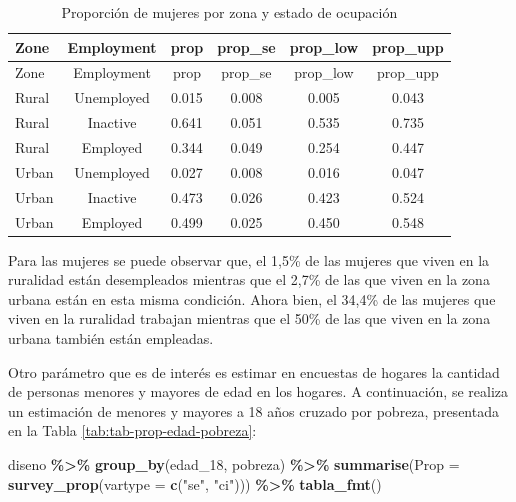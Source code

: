 \documentclass[
  spanish,
  12pt,
]{book}
\newenvironment{Shaded}{\begin{snugshade}}{\end{snugshade}}
\newcommand{\AttributeTok}[1]{\textcolor[rgb]{0.13,0.29,0.53}{#1}}
\newcommand{\FunctionTok}[1]{\textcolor[rgb]{0.13,0.29,0.53}{\textbf{#1}}}
\newcommand{\NormalTok}[1]{#1}
\newcommand{\SpecialCharTok}[1]{\textcolor[rgb]{0.81,0.36,0.00}{\textbf{#1}}}
\newcommand{\StringTok}[1]{\textcolor[rgb]{0.31,0.60,0.02}{#1}}
\begin{document}
\begin{longtable}[]{@{}lccccc@{}}
\caption{\label{tab:tab-prop-zona-empleo-mujer}Proporción de mujeres por zona y estado de ocupación}\tabularnewline
\toprule\noalign{}
Zone & Employment & prop & prop\_se & prop\_low & prop\_upp \\
\midrule\noalign{}
\endfirsthead
\toprule\noalign{}
Zone & Employment & prop & prop\_se & prop\_low & prop\_upp \\
\midrule\noalign{}
\endhead
\bottomrule\noalign{}
\endlastfoot
Rural & Unemployed & 0.015 & 0.008 & 0.005 & 0.043 \\
Rural & Inactive & 0.641 & 0.051 & 0.535 & 0.735 \\
Rural & Employed & 0.344 & 0.049 & 0.254 & 0.447 \\
Urban & Unemployed & 0.027 & 0.008 & 0.016 & 0.047 \\
Urban & Inactive & 0.473 & 0.026 & 0.423 & 0.524 \\
Urban & Employed & 0.499 & 0.025 & 0.450 & 0.548 \\
\end{longtable}

Para las mujeres se puede observar que, el 1,5\% de las mujeres que viven en la ruralidad están desempleados mientras que el 2,7\% de las que viven en la zona urbana están en esta misma condición. Ahora bien, el 34,4\% de las mujeres que viven en la ruralidad trabajan mientras que el 50\% de las que viven en la zona urbana también están empleadas.

Otro parámetro que es de interés es estimar en encuestas de hogares la cantidad de personas menores y mayores de edad en los hogares. A continuación, se realiza un estimación de menores y mayores a 18 años cruzado por pobreza, presentada en la Tabla \ref{tab:tab-prop-edad-pobreza}:

\begin{Shaded}
\begin{Highlighting}[]
\NormalTok{diseno }\SpecialCharTok{\%\textgreater{}\%} 
  \FunctionTok{group\_by}\NormalTok{(edad\_18, pobreza) }\SpecialCharTok{\%\textgreater{}\%} 
  \FunctionTok{summarise}\NormalTok{(}\AttributeTok{Prop =} \FunctionTok{survey\_prop}\NormalTok{(}\AttributeTok{vartype =}  \FunctionTok{c}\NormalTok{(}\StringTok{"se"}\NormalTok{, }\StringTok{"ci"}\NormalTok{))) }\SpecialCharTok{\%\textgreater{}\%}
  \FunctionTok{tabla\_fmt}\NormalTok{()}
\end{Highlighting}
\end{Shaded}
\end{document}
